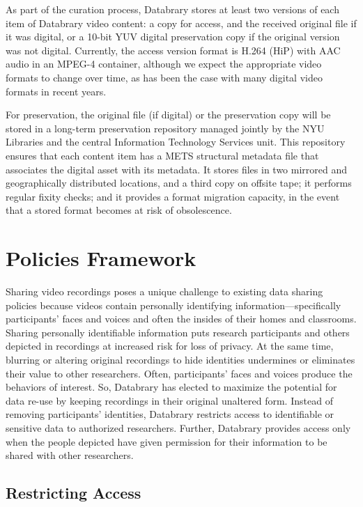 \documentclass{sig-alternate}
\begin{document}
As part of the curation process, Databrary stores at least two versions
of each item of Databrary video content: a copy for access, and the
received original file if it was digital, or a 10-bit YUV digital
preservation copy if the original version was not digital. Currently,
the access version format is H.264 (HiP) with AAC audio in an MPEG-4
container, although we expect the appropriate video formats to change
over time, as has been the case with many digital video formats in
recent years.

For preservation, the original file (if digital) or the preservation
copy will be stored in a long-term preservation repository managed
jointly by the NYU Libraries and the central Information Technology
Services unit. This repository ensures that each content item has a METS
\cite{METS} structural metadata file that associates the digital asset with its
metadata. It stores files in two mirrored and geographically distributed
locations, and a third copy on offsite tape; it performs regular fixity
checks; and it provides a format migration capacity, in the event that a
stored format becomes at risk of obsolescence.

\section{Policies Framework}

Sharing video recordings poses a unique challenge to existing data
sharing policies because videos contain personally identifying
information—specifically participants’ faces and voices and often the
insides of their homes and classrooms. Sharing personally identifiable
information puts research participants and others depicted in recordings
at increased risk for loss of privacy. At the same time, blurring or
altering original recordings to hide identities undermines or eliminates
their value to other researchers. Often, participants’ faces and voices
produce the behaviors of interest. So, Databrary has elected to maximize
the potential for data re-use by keeping recordings in their original
unaltered form. Instead of removing participants’ identities, Databrary
restricts access to identifiable or sensitive data to authorized
researchers. Further, Databrary provides access only when the people
depicted have given permission for their information to be shared with
other researchers.

\subsection{Restricting Access}
\end{document}
